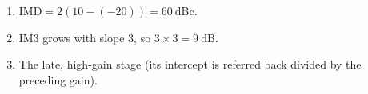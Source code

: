 \begin{enumerate}[leftmargin=1.6em,itemsep=2pt]
\item $\text{IMD} = 2(10 - (-20)) = 60\ \text{dBc}$.
\item IM3 grows with slope 3, so $3\times3 = 9\ \text{dB}$.
\item The late, high-gain stage (its intercept is referred back divided by the preceding gain).
\end{enumerate}
